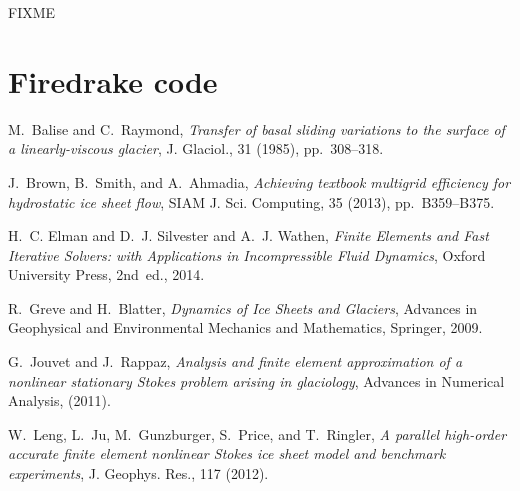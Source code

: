 \documentclass[letterpaper,final,12pt,reqno]{amsart}
\begin{document}
FIXME

\section{Firedrake code}


\footnotesize

\bigskip

\begin{thebibliography}{6}

{\sc M.~Balise and C.~Raymond}, {\em Transfer of basal sliding variations to
  the surface of a linearly-viscous glacier}, J. Glaciol., 31 (1985),
  pp.~308--318.

{\sc J.~Brown, B.~Smith, and A.~Ahmadia}, {\em Achieving textbook multigrid
  efficiency for hydrostatic ice sheet flow}, SIAM J. Sci. Computing,
  35 (2013), pp.~B359--B375.

{\sc H.~C. Elman and D.~J. Silvester and A.~J. Wathen}, {\em Finite Elements
  and Fast Iterative Solvers: with Applications in Incompressible Fluid Dynamics},
  Oxford University Press, 2nd~ed., 2014.

{\sc R.~Greve and H.~Blatter}, {\em Dynamics of {I}ce {S}heets and {G}laciers},
  Advances in Geophysical and Environmental Mechanics and Mathematics,
  Springer, 2009.

{\sc G.~Jouvet and J.~Rappaz}, {\em Analysis and finite element approximation
  of a nonlinear stationary {S}tokes problem arising in glaciology}, Advances
  in Numerical Analysis, (2011).

{\sc W.~Leng, L.~Ju, M.~Gunzburger, S.~Price, and T.~Ringler}, {\em A parallel
  high-order accurate finite element nonlinear {S}tokes ice sheet model and
  benchmark experiments}, J. Geophys. Res., 117 (2012).

\end{thebibliography}
\end{document}
